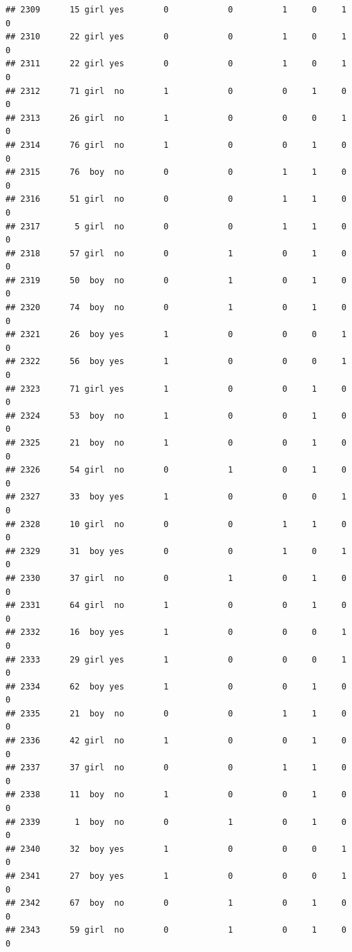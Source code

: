\documentclass[man]{apa6}
\begin{document}
\begin{verbatim}
## 2309      15 girl yes        0            0          1     0     1     0
## 2310      22 girl yes        0            0          1     0     1     0
## 2311      22 girl yes        0            0          1     0     1     0
## 2312      71 girl  no        1            0          0     1     0     0
## 2313      26 girl  no        1            0          0     0     1     0
## 2314      76 girl  no        1            0          0     1     0     0
## 2315      76  boy  no        0            0          1     1     0     0
## 2316      51 girl  no        0            0          1     1     0     0
## 2317       5 girl  no        0            0          1     1     0     0
## 2318      57 girl  no        0            1          0     1     0     0
## 2319      50  boy  no        0            1          0     1     0     0
## 2320      74  boy  no        0            1          0     1     0     0
## 2321      26  boy yes        1            0          0     0     1     0
## 2322      56  boy yes        1            0          0     0     1     0
## 2323      71 girl yes        1            0          0     1     0     0
## 2324      53  boy  no        1            0          0     1     0     0
## 2325      21  boy  no        1            0          0     1     0     0
## 2326      54 girl  no        0            1          0     1     0     0
## 2327      33  boy yes        1            0          0     0     1     0
## 2328      10 girl  no        0            0          1     1     0     0
## 2329      31  boy yes        0            0          1     0     1     0
## 2330      37 girl  no        0            1          0     1     0     0
## 2331      64 girl  no        1            0          0     1     0     0
## 2332      16  boy yes        1            0          0     0     1     0
## 2333      29 girl yes        1            0          0     0     1     0
## 2334      62  boy yes        1            0          0     1     0     0
## 2335      21  boy  no        0            0          1     1     0     0
## 2336      42 girl  no        1            0          0     1     0     0
## 2337      37 girl  no        0            0          1     1     0     0
## 2338      11  boy  no        1            0          0     1     0     0
## 2339       1  boy  no        0            1          0     1     0     0
## 2340      32  boy yes        1            0          0     0     1     0
## 2341      27  boy yes        1            0          0     0     1     0
## 2342      67  boy  no        0            1          0     1     0     0
## 2343      59 girl  no        0            1          0     1     0     0

\end{verbatim}
\end{document}
